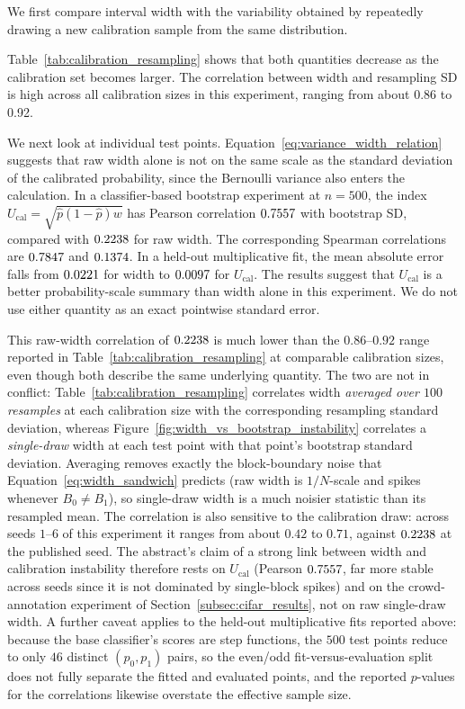 \documentclass[11pt]{article}
\begin{document}
	We first compare interval width with the variability obtained by repeatedly drawing a new calibration sample from the same distribution.
	
	
	
	Table~\ref{tab:calibration_resampling} shows that both quantities decrease as the calibration set becomes larger. The correlation between width and resampling SD is high across all calibration sizes in this experiment, ranging from about 0.86 to 0.92.
	
	We next look at individual test points. Equation~\ref{eq:variance_width_relation} suggests that raw width alone is not on the same scale as the standard deviation of the calibrated probability, since the Bernoulli variance also enters the calculation. In a classifier-based bootstrap experiment at $n = 500$, the index $U_{\mathrm{cal}}=\sqrt{\hat p(1-\hat p)w}$ has Pearson correlation $0.7557{}$ with bootstrap SD, compared with $0.2238{}$ for raw width. The corresponding Spearman correlations are $0.7847{}$ and $0.1374{}$. In a held-out multiplicative fit, the mean absolute error falls from $0.0221{}$ for width to $0.0097{}$ for $U_{\mathrm{cal}}$. The results suggest that $U_{\mathrm{cal}}$ is a better probability-scale summary than width alone in this experiment. We do not use either quantity as an exact pointwise standard error.

	This raw-width correlation of $0.2238{}$ is much lower than the $0.86$--$0.92$ range reported in Table~\ref{tab:calibration_resampling} at comparable calibration sizes, even though both describe the same underlying quantity. The two are not in conflict: Table~\ref{tab:calibration_resampling} correlates width \emph{averaged over $100$ resamples} at each calibration size with the corresponding resampling standard deviation, whereas Figure~\ref{fig:width_vs_bootstrap_instability} correlates a \emph{single-draw} width at each test point with that point's bootstrap standard deviation. Averaging removes exactly the block-boundary noise that Equation~\ref{eq:width_sandwich} predicts (raw width is $1/N$-scale and spikes whenever $B_0\ne B_1$), so single-draw width is a much noisier statistic than its resampled mean. The correlation is also sensitive to the calibration draw: across seeds $1$--$6$ of this experiment it ranges from about $0.42$ to $0.71$, against $0.2238{}$ at the published seed. The abstract's claim of a strong link between width and calibration instability therefore rests on $U_{\mathrm{cal}}$ (Pearson $0.7557{}$, far more stable across seeds since it is not dominated by single-block spikes) and on the crowd-annotation experiment of Section~\ref{subsec:cifar_results}, not on raw single-draw width. A further caveat applies to the held-out multiplicative fits reported above: because the base classifier's scores are step functions, the $500$ test points reduce to only $46$ distinct $(p_0,p_1)$ pairs, so the even/odd fit-versus-evaluation split does not fully separate the fitted and evaluated points, and the reported $p$-values for the correlations likewise overstate the effective sample size.
	
\end{document}
